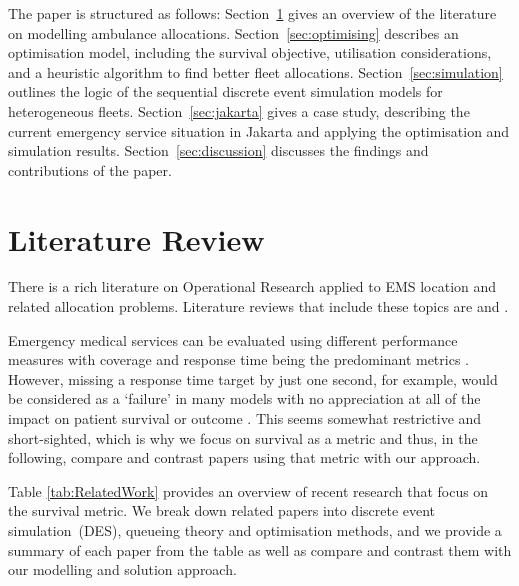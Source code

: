 \documentclass[preprint,12pt]{elsarticle}
\begin{document}
The paper is structured as follows:
Section~\ref{sec:litreview} gives an overview of the literature on modelling
ambulance allocations.
Section~\ref{sec:optimising} describes an
optimisation model, including the survival objective, utilisation
considerations, and a heuristic algorithm to find better fleet allocations.
Section~\ref{sec:simulation} outlines the logic of the sequential discrete
event simulation models for heterogeneous fleets.
Section~\ref{sec:jakarta} gives a case study, describing the current emergency
service situation in Jakarta and applying the optimisation and simulation
results.
Section~\ref{sec:discussion} discusses the findings and contributions of the
paper.



\section{Literature Review}\label{sec:litreview}
There is a rich literature on Operational Research applied to EMS location and
related allocation problems. Literature reviews that include these topics are
\citet{aringhieri2017emergency, belanger2019recent, farahani2019or, Li2011, Liu2021, reuter2017logistics}
and \citet{wang2021emergency}.

Emergency medical services can be evaluated using different performance
measures with coverage and response time being the predominant metrics
\cite{Mclay2010evaluating}. However, missing a response time target by just
one second, for example, would be considered as a `failure' in many models
with no appreciation at all of the impact on patient survival or outcome
\cite{Mclay2010evaluating}. This seems somewhat restrictive and short-sighted,
which is why we focus on survival as a metric and thus, in the following,
compare and contrast papers using that metric with our approach.

Table \ref{tab:RelatedWork} provides an overview of recent research that focus
on the survival metric. We break down related papers into discrete event
simulation~(DES), queueing theory and optimisation methods, and we provide a
summary of each paper from the table as well as compare and contrast them with
our modelling and solution approach.

\begin{table}[htbp]
\centering
\small
{}
\caption{Break down of related research that focuses on survival.}
\label{tab:RelatedWork}
\end{table}
\end{document}
